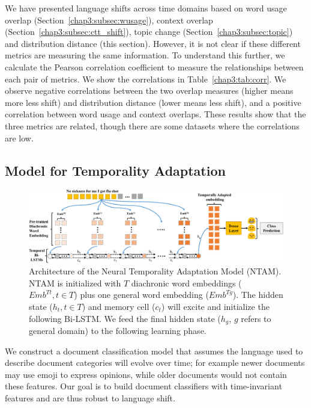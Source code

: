 We have presented language shifts across time domains based on word usage overlap (Section~\ref{chap3:subsec:wusage}), context overlap (Section~\ref{chap3:subsec:ctt_shift}), topic change (Section~\ref{chap3:subsec:topic}) and distribution distance (this section). However, it is not clear if these different metrics are measuring the same information. To understand this further, we calculate the Pearson correlation coefficient to measure the relationships between each pair of metrics. 
We show the correlations in Table~\ref{chap3:tab:corr}. We observe negative correlations between the two overlap measures (higher means more less shift) and distribution distance (lower means less shift),
and a positive correlation between word usage and context overlaps.
These results show that the three metrics are related, though there are some datasets where the correlations are low.


\subsection{Model for Temporality Adaptation}
\label{chap3:sec:model}

\begin{figure}[tb!]
\centering
\includegraphics[scale=0.47]{./images/chapter3/model.pdf}
\caption{Architecture of the Neural Temporality Adaptation Model (NTAM). 
NTAM is initialized with $T$ diachronic word embeddings ($Emb^{Tt}, t\in T$) plus one general word embedding ($Emb^{Tg}$). The hidden state ($h_t, t\in T$) and memory cell ($c_t$) will excite and initialize the following Bi-LSTM. We feed the final hidden state ($h_g$, $g$ refers to general domain) to the following learning phase.}
\label{chap3:fig:model}
\end{figure}

We construct a document classification model that assumes
the language used to describe document categories will evolve over time;
for example
newer documents may use emoji to express opinions,
while older documents would not contain these features.
Our goal is to build document classifiers with time-invariant features and are thus robust to language shift. 

